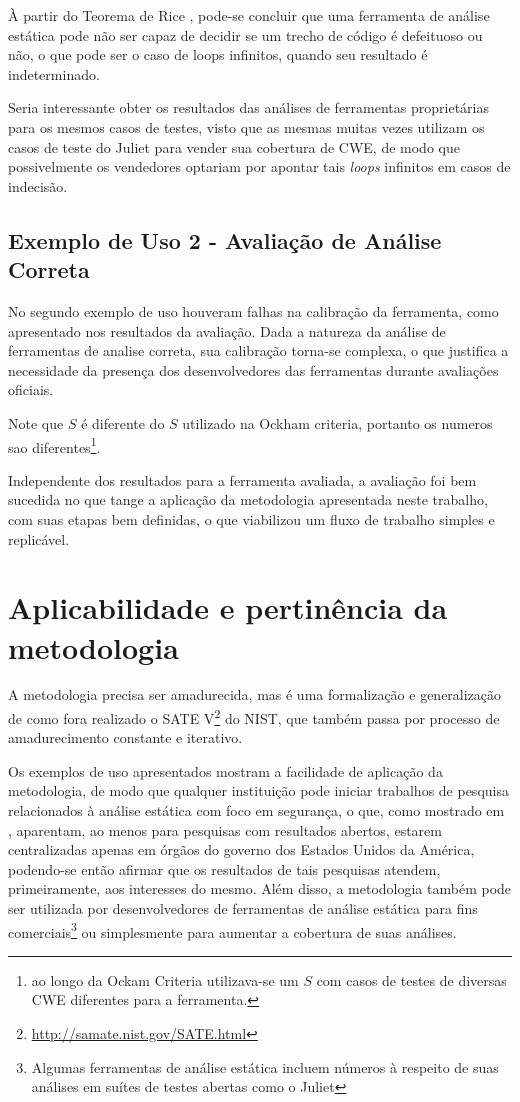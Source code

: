 À partir do Teorema de Rice \cite{rice}, pode-se concluir que uma ferramenta de análise estática pode não ser capaz de decidir se um trecho de código é defeituoso ou não, o que pode ser o caso de loops infinitos, quando seu resultado é indeterminado.

Seria interessante obter os resultados das análises de ferramentas proprietárias para os mesmos casos de testes, visto que as mesmas muitas vezes utilizam os casos de teste do Juliet para vender sua cobertura de CWE, de modo que possivelmente os vendedores optariam por apontar tais \textit{loops} infinitos em casos de indecisão.

\subsection{Exemplo de Uso 2 - Avaliação de Análise Correta}

No segundo exemplo de uso houveram falhas na calibração da ferramenta, como apresentado nos resultados da avaliação. Dada a natureza da análise de ferramentas de analise correta, sua calibração torna-se complexa, o que justifica a necessidade da presença dos desenvolvedores das ferramentas durante avaliações oficiais.

Note que $S$ é diferente do $S$ utilizado na Ockham criteria, portanto os numeros sao diferentes\footnote{ao longo da Ockam Criteria utilizava-se um $S$ com casos de testes de diversas CWE diferentes para a ferramenta.}.

Independente dos resultados para a ferramenta avaliada, a avaliação foi bem sucedida no que tange a aplicação da metodologia apresentada neste trabalho, com suas etapas bem definidas, o que viabilizou um fluxo de trabalho simples e replicável. 

\section{Aplicabilidade e pertinência da metodologia}

A metodologia precisa ser amadurecida, mas é uma formalização e generalização de como fora realizado o SATE V\footnote{\url{http://samate.nist.gov/SATE.html}} do NIST, que também passa por processo de amadurecimento constante e iterativo.

Os exemplos de uso apresentados mostram a facilidade de aplicação da metodologia, de modo que qualquer instituição pode iniciar trabalhos de pesquisa relacionados à análise estática com foco em segurança, o que, como mostrado em , aparentam, ao menos para pesquisas com resultados abertos, estarem centralizadas apenas em órgãos do governo dos Estados Unidos da América, podendo-se então afirmar que os resultados de tais pesquisas atendem, primeiramente, aos interesses do mesmo. Além disso, a metodologia também pode ser utilizada por desenvolvedores de ferramentas de análise estática para fins comerciais\footnote{Algumas ferramentas de análise estática incluem números à respeito de suas análises em suítes de testes abertas como o Juliet} ou simplesmente para aumentar a cobertura de suas análises.

